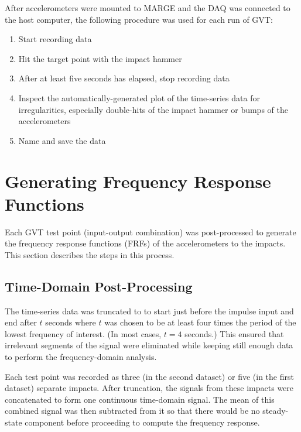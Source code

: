 After accelerometers were mounted to MARGE and the DAQ was connected to the host computer, the following procedure was used for each run of GVT:
\begin{enumerate}
	\item Start recording data
	\item Hit the target point with the impact hammer
	\item After at least five seconds has elapsed, stop recording data
	\item Inspect the automatically-generated plot of the time-series data for irregularities, especially double-hits of the impact hammer or bumps of the accelerometers
	\item Name and save the data
\end{enumerate}

\section{Generating Frequency Response Functions} %
\label{sec:generateFRF}

Each GVT test point (input-output combination) was post-processed to generate the frequency response functions (FRFs) of the accelerometers to the impacts. This section describes the steps in this process.

\subsection{Time-Domain Post-Processing}

The time-series data was truncated to to start just before the impulse input and end after $t$ seconds where $t$ was chosen to be at least four times the period of the lowest frequency of interest. (In most cases, $t=4$ seconds.) This ensured that irrelevant segments of the signal were eliminated while keeping still enough data to perform the frequency-domain analysis.

Each test point was recorded as three (in the second dataset) or five (in the first dataset) separate impacts. After truncation, the signals from these impacts were concatenated to form one continuous time-domain signal. The mean of this combined signal was then subtracted from it so that there would be no steady-state component before proceeding to compute the frequency response.

